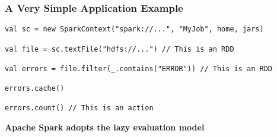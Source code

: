 \begin{frame}[fragile]
\frametitle{A Very Simple Application Example}


\begin{lstlisting}
val sc = new SparkContext("spark://...", "MyJob", home, jars) 

val file = sc.textFile("hdfs://...") // This is an RDD

val errors = file.filter(_.contains("ERROR")) // This is an RDD

errors.cache()

errors.count() // This is an action
\end{lstlisting}

{\bf Apache Spark adopts the lazy evaluation model}

\end{frame}





